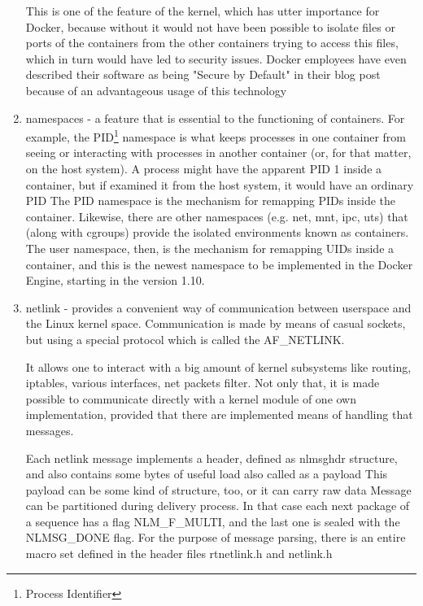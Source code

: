 \begin{enumerate}
This is one of the feature of the kernel, which has utter importance for Docker,
because without it would not have been possible to isolate files or ports
of the containers from the other containers trying to access this files,
which in turn would have led to security issues.
Docker employees have even described their software as being "Secure by Default"
in their blog post \cite{SELinuxDockBlog} because of an advantageous
usage of this technology

\item namespaces - a feature that is essential
to the functioning of containers.
For example, the PID\footnote{Process Identifier} namespace
is what keeps processes
in one container from seeing or interacting with processes
in another container (or, for that matter, on the host system).
A process might have the apparent PID 1 inside a container,
but if examined it from the host system,
it would have an ordinary PID
The PID namespace is the mechanism for remapping PIDs
inside the container. Likewise,
there are other namespaces (e.g. net, mnt, ipc, uts)
that (along with cgroups) provide
the isolated environments known as containers.\cite{DockerNamespaces}
The user namespace, then, is the mechanism
for remapping UIDs inside a container, and this is the newest
namespace to be implemented
in the Docker Engine,
starting in the version 1.10.\cite{DockerSuccessNamespaces}

\item netlink - provides a convenient way of communication
between userspace and the Linux kernel space.
Communication is made by means of casual sockets,
but using a special protocol which is called the AF\_NETLINK.

It allows one to interact with a big amount of kernel subsystems
like routing, iptables, various interfaces, net packets filter.
Not only that, it is made possible to communicate directly with a kernel
module of one own implementation, provided that
there are implemented means of handling that messages.

Each netlink message implements a header,
defined as nlmsghdr structure,
and also contains some bytes of useful load also called as a payload
This payload can be some kind of structure, too, or it can carry raw data
Message can be partitioned during delivery process.
In that case each next package of a sequence has a flag NLM\_F\_MULTI,
and the last one is sealed with the NLMSG\_DONE flag.
For the purpose of message parsing, there is an entire macro set
defined in the header files rtnetlink.h and netlink.h


\end{enumerate}
